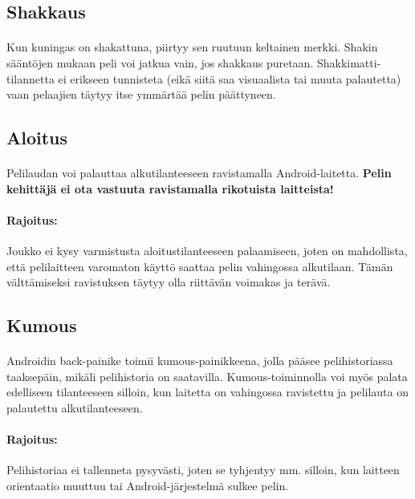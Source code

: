 \documentclass[11pt]{article}
\begin{document}
\subsection{Shakkaus}

\paragraph{} Kun kuningas on shakattuna, piirtyy sen ruutuun keltainen merkki. Shakin sääntöjen mukaan peli voi jatkua vain, jos shakkaus puretaan. Shakkimatti-tilannetta ei erikseen tunnisteta (eikä siitä saa visuaalista tai muuta palautetta) vaan pelaajien täytyy itse ymmärtää pelin päättyneen.

\subsection{Aloitus}

\paragraph{} Pelilaudan voi palauttaa alkutilanteeseen ravistamalla Android-laitetta. \textbf{Pelin kehittäjä ei ota vastuuta ravistamalla rikotuista laitteista!}

\paragraph{Rajoitus:} Joukko ei kysy varmistusta aloitustilanteeseen palaamiseen, joten on mahdollista, että pelilaitteen varomaton käyttö saattaa pelin vahingossa alkutilaan. Tämän välttämiseksi ravistuksen täytyy olla riittävän voimakas ja terävä.

\subsection{Kumous}

\paragraph{} Androidin back-painike toimii kumous-painikkeena, jolla pääsee pelihistoriassa taaksepäin, mikäli pelihistoria on saatavilla. Kumous-toiminnolla voi myös palata edelliseen tilanteeseen silloin, kun laitetta on vahingossa ravistettu ja pelilauta on palautettu alkutilanteeseen.

\paragraph{Rajoitus:} Pelihistoriaa ei tallenneta pysyvästi, joten se tyhjentyy mm. silloin, kun laitteen orientaatio muuttuu tai Android-järjestelmä sulkee pelin.
\end{document}
